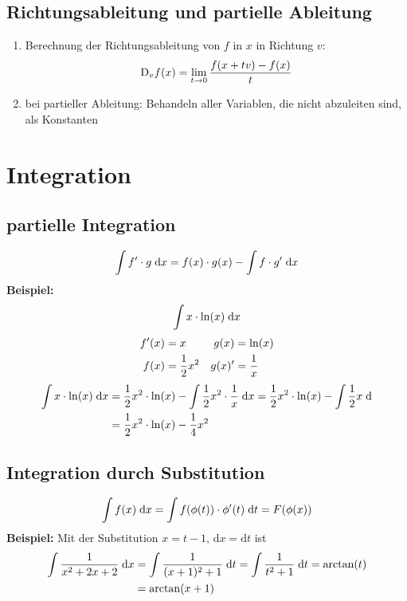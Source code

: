 \documentclass[ngerman,a4paper]{article}
\begin{document}
\subsection{Richtungsableitung und partielle Ableitung}
\begin{enumerate}[label=\textbf{\arabic*.}]
	\item Berechnung der Richtungsableitung von $f$ in $x$ in Richtung $v$:
	\begin{align}
		\mathrm{D}_vf(x)=\lim\limits_{t\to 0}\frac{f(x+tv)-f(x)}{t}\notag
	\end{align}
	\item bei partieller Ableitung: Behandeln aller Variablen, die nicht abzuleiten sind, als Konstanten
\end{enumerate}

\section{Integration}

\subsection{partielle Integration}
\begin{align}
	\int f'\cdot g\;\mathrm{d}x=f(x)\cdot g(x)-\int f\cdot g'\;\mathrm{d}x\notag
\end{align}
\textbf{Beispiel:} 
\begin{align}
	\int x\cdot \ln(x) \;\mathrm{d}x\notag
\end{align}
\begin{align}
	f'(x) &= x & g(x) &= \ln(x) \notag \\
	f(x) &= \frac{1}{2}x^2 & g(x)' &= \frac{1}{x}\notag
\end{align}
\begin{align}
	\int x\cdot \ln(x) \;\mathrm{d}x &= \frac{1}{2}x^2\cdot\ln(x)-\int \frac{1}{2}x^2\cdot\frac{1}{x}\;\mathrm{d}x = \frac{1}{2}x^2\cdot\ln(x)-\int \frac{1}{2}x\;\mathrm{d} \notag \\
	&= \frac{1}{2}x^2\cdot\ln(x)-\frac{1}{4}x^2\notag
\end{align}

\subsection{Integration durch Substitution}
\begin{align}
	\int f(x)\;\mathrm{d}x = \int f(\phi(t))\cdot\phi'(t)\;\mathrm{d}t=F(\phi(x))\notag
\end{align}
\textbf{Beispiel:} Mit der Substitution $x=t-1$, $\mathrm{d}x=\mathrm{d}t$ ist
\begin{align}
	\int\frac{1}{x^2+2x+2}\;\mathrm{d}x &= \int\frac{1}{(x+1)^2+1}\;\mathrm{d}t = \int\frac{1}{t^2+1}\;\mathrm{d}t = \arctan(t) \notag \\
	&= \arctan(x+1)\notag
\end{align}
\end{document}
